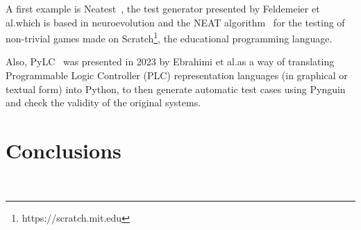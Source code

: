 \documentclass[%
  chapterprefix=false,%
  open=right,%
  twoside=true,%
  paper=a4,%
  logofile={Figures/logo.png},%
  thesistype=master,%
  UKenglish,%
]{se2thesis}
\begin{document}
A first example is Neatest~\cite{DBLP:conf/kbse/Feldmeier022}, the test generator presented by Feldemeier et al.\@ which is based in neuroevolution and the NEAT algorithm~\cite{stanley2002evolving} for the testing of non-trivial games made on Scratch\footnote{https://scratch.mit.edu}, the educational programming language.

Also, PyLC~\cite{DBLP:conf/sac/SalariEAS23} was presented in 2023 by Ebrahimi et al.\@ as a way of translating Programmable Logic Controller (PLC) representation languages (in graphical or textual form) into Python, to then generate automatic test cases using Pynguin and check the validity of the original systems.

\chapter{Conclusions}~\label{chap:conclusions}

\backmatter{}

\printbibliography{}
\end{document}
